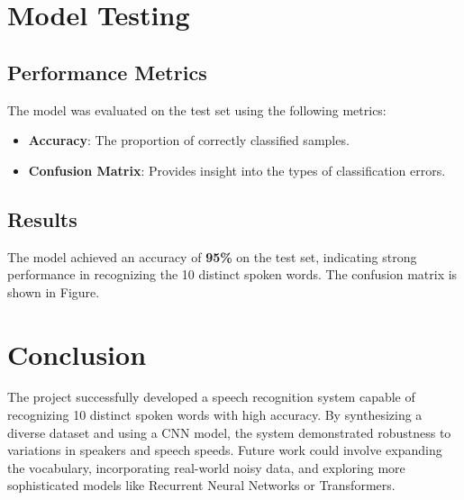 \documentclass[12pt]{article}
\begin{document}


\section{Model Testing}

\subsection{Performance Metrics}

The model was evaluated on the test set using the following metrics:

\begin{itemize}
    \item \textbf{Accuracy}: The proportion of correctly classified samples.
    \item \textbf{Confusion Matrix}: Provides insight into the types of classification errors.
\end{itemize}

\subsection{Results}

The model achieved an accuracy of \textbf{95\%} on the test set, indicating strong performance in recognizing the 10 distinct spoken words. The confusion matrix is shown in Figure.

\newpage




\section{Conclusion}

The project successfully developed a speech recognition system capable of recognizing 10 distinct spoken words with high accuracy. By synthesizing a diverse dataset and using a CNN model, the system demonstrated robustness to variations in speakers and speech speeds. Future work could involve expanding the vocabulary, incorporating real-world noisy data, and exploring more sophisticated models like Recurrent Neural Networks or Transformers.
\end{document}

